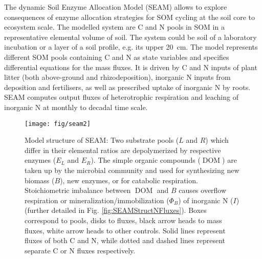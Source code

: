 The dynamic Soil Enzyme Allocation Model (SEAM) allows to explore consequences
of enzyme allocation strategies for SOM cycling at the soil core to ecosystem
scale. The modelled system are C and N pools in SOM in a representative
elemental volume of soil. The system could be soil of a laboratory incubation or
a layer of a soil profile, e.g. its upper 20~\unit{cm}.
The model represents different SOM pools containing C and N as state variables
and specifies differential equations for the mass fluxes. It is driven by C and
N inputs of plant litter (both above-ground and rhizodeposition), inorganic N
inputs from deposition and fertilisers, as well as prescribed
uptake of inorganic N by roots. SEAM computes output fluxes of heterotrophic
respiration and leaching of inorganic N at monthly to decadal time scale.

\begin{figure}[t] \vspace*{2mm}
\begin{center}
\texttt{[image: fig/seam2]}
\end{center}
\caption{
Model structure of SEAM: Two substrate pools ($L$ and $R$) which differ in their
elemental ratios are depolymerized by respective enzymes ($E_L$ and $E_R$). The
simple organic compounds ($\operatorname{DOM}$) are taken up by the microbial
community  and used for synthesizing new biomass (${B}$), new enzymes, or for
catabolic respiration. Stoichiometric imbalance between $\operatorname{DOM}$ and
${B}$ causes overflow respiration or mineralization/immobilization ($\Phi_B$) of
inorganic N ($I$) (further detailed in Fig.
\ref{fig:SEAMStructNFluxes}).
Boxes correspond to pools, disks to fluxes, black arrow heads to mass fluxes,
white arrow heads to other controls. Solid lines
represent fluxes of both C and N, while dotted and dashed lines represent
separate C or N fluxes respectively.
\label{fig:SEAMStruct}
}
\end{figure}

